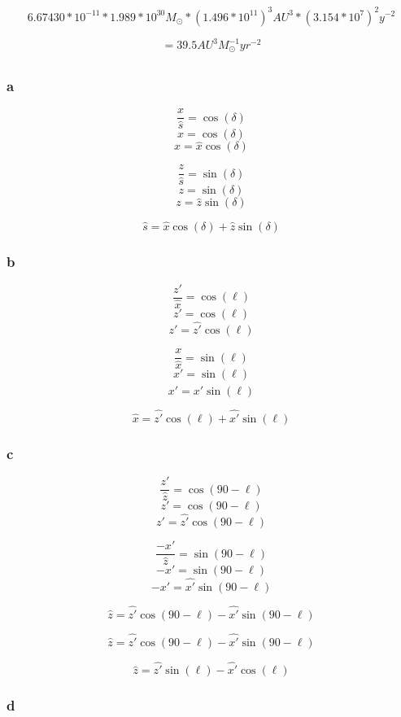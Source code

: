 \documentclass{article}
\begin{document}
\[6.67430 * 10^{-11} * 1.989 * 10^{30} M_{\odot} * {(1.496 * 10^{11})}^3 AU^3 * {(3.154 * 10^7)}^2 y^{-2}\] 

\[ = 39.5 AU^{3} M_{\odot}^{-1} yr^{-2}\]

\subsection{}

\subsubsection{a}

\[\frac{x}{\hat{s}} = \cos(\delta)\]
\[x = \cos(\delta)\]
\[x = \hat{x}\cos(\delta)\]

\[\frac{z}{\hat{s}} = \sin(\delta)\]
\[z = \sin(\delta)\]
\[z = \hat{z}\sin(\delta)\]

\[\hat{s} = \hat{x}\cos(\delta) + \hat{z}\sin(\delta) \]

\subsubsection{b}

\[\frac{z'}{\hat{x}} = \cos(\ell)\]
\[z' = \cos(\ell)\]
\[z' = \hat{z'}\cos(\ell)\]

\[\frac{x}{\hat{x}} = \sin(\ell)\]
\[x' = \sin(\ell)\]
\[x' = \hat{x'}\sin(\ell)\]

\[\hat{x} = \hat{z'}\cos(\ell) + \hat{x'}\sin(\ell)\]

\subsubsection{c}

\[\frac{z'}{\hat{z}} = \cos(90 - \ell)\]
\[z' = \cos(90 - \ell)\]
\[z' = \hat{z'}\cos(90 - \ell)\]

\[\frac{-x'}{\hat{z}} = \sin(90 - \ell)\]
\[-x' = \sin(90 - \ell)\]
\[-x' = \hat{x'}\sin(90 - \ell)\]

\[\hat{z} = \hat{z'}\cos(90 - \ell) - \hat{x'}\sin(90 - \ell)\]

\[\hat{z} = \hat{z'}\cos(90 - \ell) - \hat{x'}\sin(90 - \ell)\]

\[\hat{z} = \hat{z'}\sin(\ell) - \hat{x'}\cos(\ell)\]

\subsubsection{d}
\end{document}
